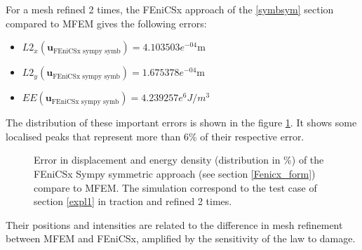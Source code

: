 \documentclass[12pt]{article}
\newcommand{\f}[1]{FEniCSx#1}
\newcommand{\vm}[1]{
	{\ensuremath{\mathbf{#1}}}
}
\begin{document}
For a mesh refined 2 times, the \f{} approach of the \ref{symbsym} section compared to MFEM gives the following errors:
\begin{itemize}
	\item $L2_x(\vm{u}_{\text{\f{} sympy symb}})=4.103503e^{-04}$m
	\item $L2_y(\vm{u}_{\text{\f{} sympy symb}})= 1.675378e^{-04}$m
	\item $EE(\vm{u}_{\text{\f{} sympy symb}})= 4.239257e^{6}J/m^3$
\end{itemize}
The distribution of these important errors is shown in the figure \ref{diff_u_ref2}. It shows some localised peaks that represent more than 6\% of their respective error.
\begin{figure}	
	\centering
	\caption{Error in displacement and energy density (distribution in \%) of the \f{} Sympy symmetric approach (see section \ref{Fenicx_form}) compare to MFEM. The simulation correspond to the test case of section \ref{expl1} in traction and refined 2 times.\label{diff_u_ref2}}
\end{figure}
Their positions and intensities are related to the difference in mesh refinement between MFEM and \f{}, amplified by the sensitivity of the law to damage.
\end{document}
